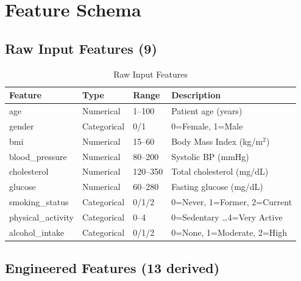 \documentclass[12pt,a4paper]{report}
\begin{document}
\section{Feature Schema}

\subsection{Raw Input Features (9)}

\begin{table}[H]
\centering
\caption{Raw Input Features}
\label{tab:raw_features}
\begin{tabular}{llll}
\toprule
\textbf{Feature} & \textbf{Type} & \textbf{Range} & \textbf{Description} \\
\midrule
age & Numerical & 1--100 & Patient age (years) \\
gender & Categorical & 0/1 & 0=Female, 1=Male \\
bmi & Numerical & 15--60 & Body Mass Index (kg/m$^2$) \\
blood\_pressure & Numerical & 80--200 & Systolic BP (mmHg) \\
cholesterol & Numerical & 120--350 & Total cholesterol (mg/dL) \\
glucose & Numerical & 60--280 & Fasting glucose (mg/dL) \\
smoking\_status & Categorical & 0/1/2 & 0=Never, 1=Former, 2=Current \\
physical\_activity & Categorical & 0--4 & 0=Sedentary \ldots 4=Very Active \\
alcohol\_intake & Categorical & 0/1/2 & 0=None, 1=Moderate, 2=High \\
\bottomrule
\end{tabular}
\end{table}

\subsection{Engineered Features (13 derived)}
\end{document}

